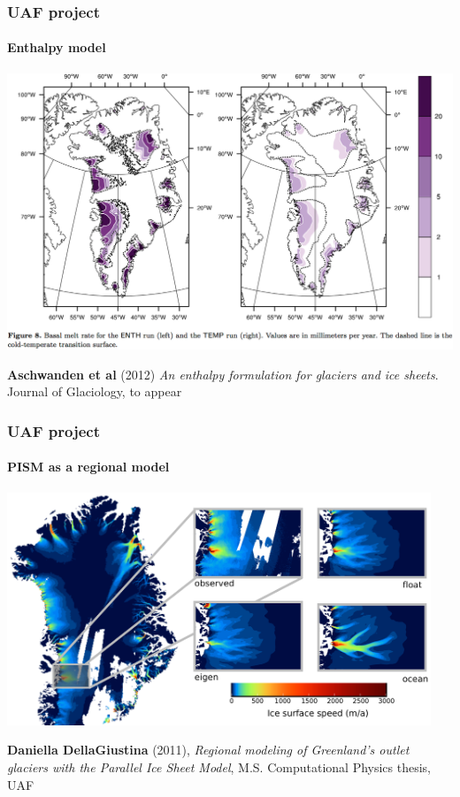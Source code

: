 \documentclass[hide notes,intlimits]{beamer}
\begin{document}
\begin{frame}
  \frametitle{UAF project}
  \framesubtitle{Enthalpy model}

  \begin{center}
    \includegraphics[height=0.7\textheight]{enthalpy-model.png}
  \end{center}

  \begin{flushleft}
  \tiny \textbf{Aschwanden et al} (2012) \emph{An enthalpy
      formulation for glaciers and ice sheets}. Journal of Glaciology, to
    appear
 \end{flushleft}
\end{frame}

\begin{frame}
  \frametitle{UAF project}
  \framesubtitle{PISM as a regional model}
  \begin{center}
    \includegraphics[width=0.95\textwidth]{csurf-regional.png}
  \end{center}
  \begin{flushleft}
    \tiny \textbf{Daniella DellaGiustina} (2011), \emph{Regional modeling of
      Greenland's outlet glaciers with the Parallel Ice Sheet Model}, M.S.
    Computational Physics thesis, UAF
  \end{flushleft}
\end{frame}
\end{document}
